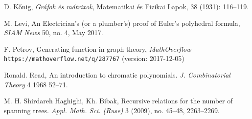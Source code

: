 \begin{thebibliography}{52}
 D. K\H{o}nig, \emph{Gr\'{a}fok \'{e}s m\'{a}trixok}, Matematikai és Fizikai Lapok, 38 (1931): 116--119.

 M. Levi,
An Electrician’s (or a plumber’s)
proof of Euler’s polyhedral formula,
\emph{SIAM News} 50, no. 4, May 2017.

 F. Petrov, Generating function in graph theory,
\emph{MathOverflow}
\texttt{https://mathoverflow.net/q/287767} (version: 2017-12-05)

 Ronald. Read, 
An introduction to chromatic polynomials.
\emph{J. Combinatorial Theory} 4 1968 52--71.

 M. H. Shirdareh Haghighi, Kh. Bibak, 
Recursive relations for the number of spanning trees. 
\emph{Appl. Math. Sci. (Ruse)} 3 (2009), no. 45--48, 2263--2269.
\end{thebibliography}

